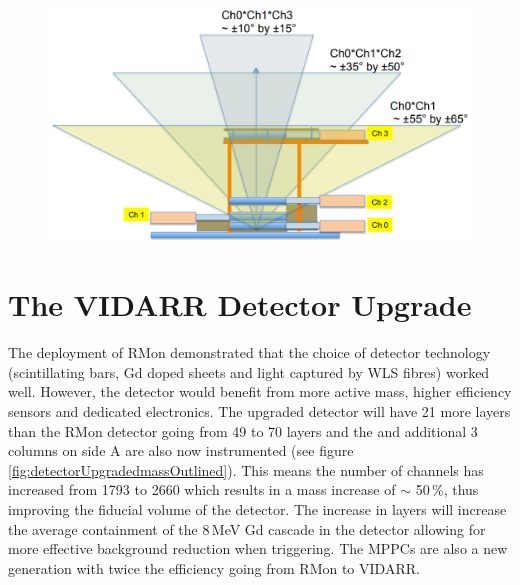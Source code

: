 \begin{figure}[!h]
 \centering
 \includegraphics[width=0.7\linewidth]{Chapter2/Figs/Raster/Prospect_MuonPaddels.png}
 \label{fig:Prospect_MuonPaddels}
\end{figure}

\vspace{3cm}

\section{The VIDARR Detector Upgrade}\label{sec:theUpgradedDetector}
The deployment of RMon demonstrated that the choice of detector technology (scintillating bars, Gd doped sheets and light captured by WLS fibres) worked well. However, the detector would benefit from more active mass, higher efficiency sensors and dedicated electronics. The upgraded detector will have 21 more layers than the RMon detector going from 49 to 70 layers and the and additional 3 columns on side A are also now instrumented (see figure \ref{fig:detectorUpgradedmassOutlined}). This means the number of channels has increased from 1793 to 2660 which results in a mass increase of $\sim$ 50\,\%, thus improving the fiducial volume of the detector. The increase in layers will increase the average containment of the 8\,MeV Gd cascade in the detector allowing for more effective background reduction when triggering. The MPPCs are also a new generation with twice the efficiency going from RMon to VIDARR. %

